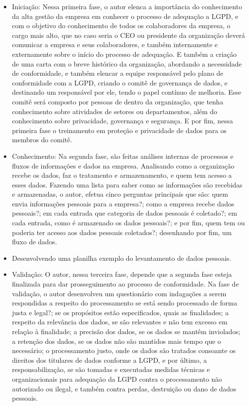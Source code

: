 \documentclass[
	12pt,				%
	openright,			%
	oneside,			%
	a4paper,			%
	english,			%
	french,				%
	spanish,			%
	brazil,				%
	]{abntex2}
\begin{document}
\begin{itemize}
\item Iniciação: Nessa primeira fase, o autor elenca a importância do conhecimento da alta gestão da empresa em conhecer o processo de adequação a LGPD, e com o objetivo do conhecimento de todos os colaboradores da empresa, o cargo mais alto, que no caso seria o CEO ou presidente da organização deverá comunicar a empresa e seus colaboradores, e também internamente e externamente sobre o início do processo de adequação. E também a criação de uma carta com o breve histórico da organização, abordando a necessidade de conformidade, e também elencar a equipe responsável pelo plano de conformidade com a LGPD, criando o comitê de governança de dados, e destinando um responsável por ele, tendo o papel contínuo de melhoria. Esse comitê será composto por pessoas de dentro da organização, que tenha conhecimento sobre atividades de setores ou departamentos, além do conhecimento sobre privacidade, governança e segurança. E por fim, nessa primeira fase o treinamento em proteção e privacidade de dados para os membros do comitê.
\item  Conhecimento: Na segunda fase, são feitas análises internas de processos e fluxos de informações e dados na empresa. Analisando como a organização recebe os dados, faz o tratamento e armazenamento, e quem tem acesso a esses dados. Fazendo uma lista para saber como as informações são recebidas e armazenadas, o autor, efetua cinco perguntas principais que são: quem envia informações pessoais para a empresa?; como a empresa recebe dados pessoais?; em cada entrada que categoria de dados pessoais é coletado?; em cada entrada, como é armazenado os dados pessoais?; e por fim, quem tem ou poderia ter acesso aos dados pessoais coletados?; desenhando por fim, um fluxo de dados.
\item Desenvolvendo uma planilha exemplo do levantamento de dados pessoais.
\item Validação: O autor, nessa terceira fase, depende que a segunda fase esteja finalizada para dar prosseguimento ao processo de conformidade. Na fase de validação, o autor desenvolveu um questionário com indagações a serem respondidas a respeito do processamento se está sendo processado de forma justa e legal?; se os propósitos estão especificados, quais as finalidades; a respeito da relevância dos dados, se são relevantes e não tem excesso em relação à finalidade; a precisão dos dados, se os dados se mantêm inviolados; a retenção dos dados, se os dados não são mantidos mais tempo que o necessário; o processamento justo, onde os dados são tratados consoante os direitos dos titulares de dados conforme a LGPD, e por último, a responsabilização, se são tomadas e executadas medidas técnicas e organizacionais para adequação da LGPD contra o processamento não autorizado ou ilegal, e também contra perdas, destruição ou dano de dados pessoais.

\end{itemize}
\end{document}
